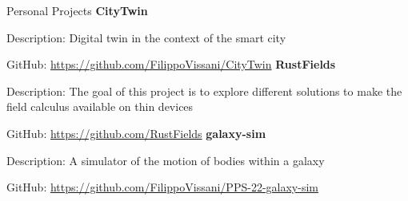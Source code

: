\begin{rubric}{Personal Projects}
\entry*[2023] \textbf{CityTwin}
\par Description: Digital twin in the context of the smart city
\par GitHub: \url{https://github.com/FilippoVissani/CityTwin}
%
\entry*[2023] \textbf{RustFields}
\par Description: The goal of this project is to explore different solutions to make the field calculus available on thin devices
\par GitHub: \url{https://github.com/RustFields}
%
\entry*[2022] \textbf{galaxy-sim}
\par Description: A simulator of the motion of bodies within a galaxy
\par GitHub: \url{https://github.com/FilippoVissani/PPS-22-galaxy-sim}

\end{rubric}
